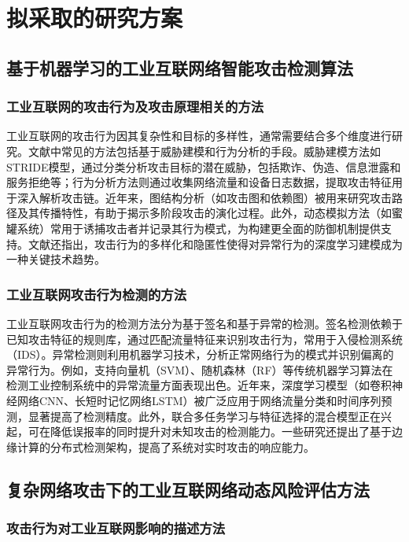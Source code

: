 \section{拟采取的研究方案}

\subsection{基于机器学习的工业互联网络智能攻击检测算法}

\subsubsection{工业互联网的攻击行为及攻击原理相关的方法}

工业互联网的攻击行为因其复杂性和目标的多样性，通常需要结合多个维度进行研究。文献中常见的方法包括基于威胁建模和行为分析的手段。威胁建模方法如STRIDE模型，通过分类分析攻击目标的潜在威胁，包括欺诈、伪造、信息泄露和服务拒绝等；行为分析方法则通过收集网络流量和设备日志数据，提取攻击特征用于深入解析攻击链。近年来，图结构分析（如攻击图和依赖图）被用来研究攻击路径及其传播特性，有助于揭示多阶段攻击的演化过程。此外，动态模拟方法（如蜜罐系统）常用于诱捕攻击者并记录其行为模式，为构建更全面的防御机制提供支持。文献还指出，攻击行为的多样化和隐匿性使得对异常行为的深度学习建模成为一种关键技术趋势。

\subsubsection{工业互联网攻击行为检测的方法}

工业互联网攻击行为的检测方法分为基于签名和基于异常的检测。签名检测依赖于已知攻击特征的规则库，通过匹配流量特征来识别攻击行为，常用于入侵检测系统（IDS）。异常检测则利用机器学习技术，分析正常网络行为的模式并识别偏离的异常行为。例如，支持向量机（SVM）、随机森林（RF）等传统机器学习算法在检测工业控制系统中的异常流量方面表现出色。近年来，深度学习模型（如卷积神经网络CNN、长短时记忆网络LSTM）被广泛应用于网络流量分类和时间序列预测，显著提高了检测精度。此外，联合多任务学习与特征选择的混合模型正在兴起，可在降低误报率的同时提升对未知攻击的检测能力。一些研究还提出了基于边缘计算的分布式检测架构，提高了系统对实时攻击的响应能力。

\subsection{复杂网络攻击下的工业互联网络动态风险评估方法}

\subsubsection{攻击行为对工业互联网影响的描述方法}

